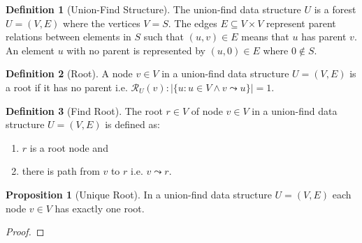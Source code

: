 \documentclass[a4paper,12pt]{article}
\theoremstyle{definition}
\newtheorem{definition}{Definition}[section]
\newtheorem{proposition}{Proposition}[section]
\begin{document}
\begin{definition}[Union-Find Structure]
    The union-find data structure $U$ is a forest $U = (V, E)$ where the
    vertices $V = S$. The edges $E \subseteq V \times V$ represent parent
    relations between elements in $S$ such that $(u, v) \in E$ means that $u$ has
    parent $v$. An element $u$ with no parent is represented by $(u, 0) \in E$ where
    $0 \notin S$.
\end{definition}

\begin{definition}[Root]
    A node $v \in V$ in a union-find data structure $U = (V, E)$ is a root if it
    has no parent i.e. $\mathcal{R}_U(v) : |\{u : u \in V \land v \leadsto u\}| = 1$.
\end{definition}

\begin{definition}[Find Root]
    The root $r \in V$ of node $v \in V$ in a union-find data structure $U = (V,
    E)$ is defined as:
    \begin{enumerate}
        \item $r$ is a root node and
        \item there is path from $v$ to $r$ i.e. $v \leadsto r$.
    \end{enumerate}
\end{definition}

\begin{proposition}[Unique Root]
    In a union-find data structure $U = (V, E)$ each node $v \in V$ has exactly
    one root.
\end{proposition}
\begin{proof}
    
\end{proof}
\end{document}
